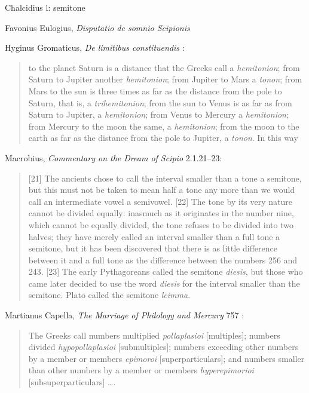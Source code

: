 \documentclass{article}
\theoremstyle{definition}
\begin{document}
Chalcidius l: semitone \cite{calcidius}

Favonius Eulogius, {\em Disputatio de somnio Scipionis} \cite{favonius}

Hyginus Gromaticus, {\em De limitibus constituendis} \cite[p.~146]{campbell}:

\begin{quote}
to the planet Saturn is a distance that the Greeks call a {\em hemitonion}; from Saturn to
Jupiter another {\em hemitonion}; from Jupiter to Mars a {\em tonon}; from Mars to the sun is
three times as far as the distance from the pole to Saturn, that is, a {\em trihemitonion}; from
the sun to Venus is as far as from Saturn to Jupiter, a {\em hemitonion}; from Venus to
Mercury a {\em hemitonion}; from Mercury to the moon the same, a {\em hemitonion}; from the
moon to the earth as far as the distance from the pole to Jupiter, a {\em tonon}. In this way
\end{quote}

Macrobius, {\em Commentary on the Dream of Scipio} \cite[pp.~188--189]{macrobius} 2.1.21--23:

\begin{quote}
[21] The ancients chose to call the interval smaller than a tone a semitone, but this must not be taken to mean half a tone
any more than we would call an intermediate vowel a semivowel. [22] The tone by its
very nature cannot be divided equally: inasmuch as it originates in the number nine, which cannot be equally divided,
the tone refuses to be divided into two halves; they have merely called an interval smaller than a full tone a semitone,
but it has been discovered that there is as little difference between it and a full tone as the difference
between the numbers 256 and 243. [23] The early Pythagoreans called the semitone {\em diesis}, but those who came later
decided to use the word {\em diesis} for the interval smaller than the semitone. Plato called the semitone
{\em leimma}.
\end{quote}

Martianus Capella, {\em The Marriage of Philology and Mercury} \cite{martianusII} 757 \cite[p.~293]{martianusII}:

\begin{quote}
The Greeks call numbers multiplied {\em pollaplasioi}
[multiples]; numbers divided {\em hypopollaplasioi} [submultiples];
numbers exceeding other numbers by a member or members {\em epimoroi}
[superparticulars]; and numbers smaller than other numbers by a 
member or members {\em hyperepimorioi} [subsuperparticulars] \dots.
\end{quote}
\end{document}
